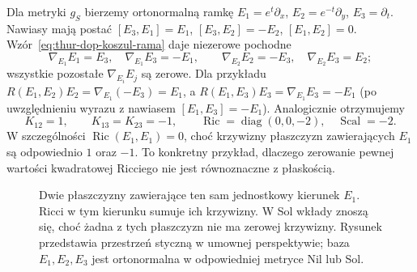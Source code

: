 \begin{przyklad}
\label{prz:thur-dop-krzywizna-sol}
Dla metryki $g_S$ bierzemy ortonormalną ramkę
$E_1=e^t\partial_x$, $E_2=e^{-t}\partial_y$,
$E_3=\partial_t$. Nawiasy mają postać
$[E_3,E_1]=E_1$, $[E_3,E_2]=-E_2$,
$[E_1,E_2]=0$. Wzór~\eqref{eq:thur-dop-koszul-rama}
daje niezerowe pochodne
\[
\nabla_{E_1}E_1=E_3,\quad \nabla_{E_1}E_3=-E_1,
\qquad \nabla_{E_2}E_2=-E_3,\quad
\nabla_{E_2}E_3=E_2;
\]
wszystkie pozostałe $\nabla_{E_i}E_j$ są zerowe.
Dla przykładu
$R(E_1,E_2)E_2=\nabla_{E_1}(-E_3)=E_1$,
a $R(E_1,E_3)E_3=\nabla_{E_1}E_3=-E_1$
(po uwzględnieniu wyrazu z nawiasem $[E_1,E_3]=-E_1$).
Analogicznie otrzymujemy
\[
 K_{12}=1,\qquad K_{13}=K_{23}=-1,
 \qquad \operatorname{Ric}=\operatorname{diag}(0,0,-2),
 \quad \operatorname{Scal}=-2.
\]
W szczególności $\operatorname{Ric}(E_1,E_1)=0$,
choć krzywizny płaszczyzn zawierających $E_1$
są odpowiednio $1$ oraz $-1$. To konkretny
przykład, dlaczego zerowanie pewnej wartości kwadratowej
Ricciego nie jest równoznaczne z płaskością.
\end{przyklad}

\begin{figure}[H]
\centering
{}
\caption{Dwie płaszczyzny zawierające ten sam jednostkowy
kierunek $E_1$. Ricci w tym kierunku sumuje ich krzywizny.
W Sol wkłady znoszą się, choć żadna z tych płaszczyzn
nie ma zerowej krzywizny. Rysunek przedstawia przestrzeń styczną
w umownej perspektywie; baza $E_1,E_2,E_3$ jest ortonormalna
w odpowiedniej metryce Nil lub Sol.}
\label{fig:ricci-nil-sol-suma}
\end{figure}

